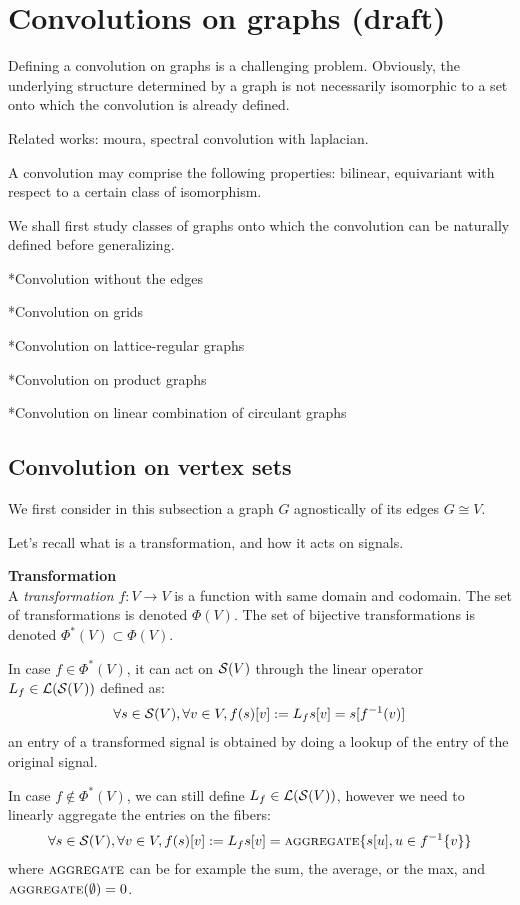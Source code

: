 \section{Convolutions on graphs (draft)}

Defining a convolution on graphs is a challenging problem. Obviously, the underlying structure determined by a graph is not necessarily isomorphic to a set onto which the convolution is already defined. 

Related works: moura, spectral convolution with laplacian.

A convolution may comprise the following properties: bilinear, equivariant with respect to a certain class of isomorphism.

We shall first study classes of graphs onto which the convolution can be naturally defined before generalizing.

*Convolution without the edges

*Convolution on grids

*Convolution on lattice-regular graphs

*Convolution on product graphs

*Convolution on linear combination of circulant graphs


\subsection{Convolution on vertex sets}

We first consider in this subsection a graph $G$ agnostically of its edges \ie $G \cong V$.

Let's recall what is a transformation, and how it acts on signals.

\begin{definition}\textbf{Transformation}\\
A \emph{transformation} $f: V \rightarrow V$ is a function with same domain and codomain. The set of transformations is denoted $\Phi(V)$. The set of bijective transformations is denoted $\Phi^*(V) \subset \Phi(V)$.

In case $f \in \Phi^*(V)$, it can act on $\mathcal{S}(V)$ through the linear operator $L_f \in \mathcal{L}(\mathcal{S}(V))$ defined as:
\begin{gather*}
\forall s \in \mathcal{S}(V), \forall v \in V, f(s)[v] := L_f s[v] = s[f^{-1}(v)]
\end{gather*}
\ie an entry of a transformed signal is obtained by doing a lookup of the entry of the original signal.

In case $f \notin \Phi^*(V)$, we can still define $L_f \in \mathcal{L}(\mathcal{S}(V))$, however we need to linearly aggregate the entries on the fibers:
\begin{gather*}
\forall s \in \mathcal{S}(V), \forall v \in V, f(s)[v] := L_f s[v] = \operatorname{\textsc{aggregate}}\{s[u], u \in f^{-1}\{v\}\}
\end{gather*}
where $\operatorname{\textsc{aggregate}}$ can be for example the sum, the average, or the max, and $\operatorname{\textsc{aggregate}}(\emptyset) = 0$.
\end{definition}

